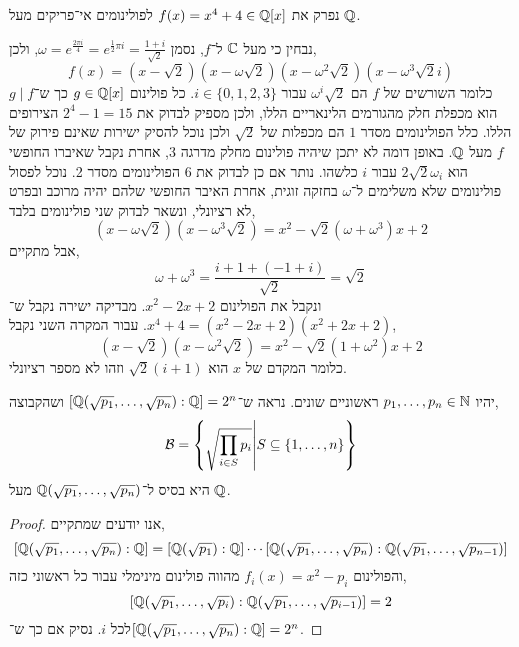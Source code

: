 \question{}
נפרק את $f(x) = x^4 + 4 \in \mathbb{Q}[x]$ לפולינומים אי־פריקים מעל $\mathbb{Q}$.
\begin{solution}
	נבחין כי מעל $\mathbb{C}$ ל־$f$, נסמן $\omega = e^{\frac{2 \pi i}{4}} = e^{\frac{1}{2} \pi i} = \frac{1 + i}{\sqrt{2}}$, ולכן,
	\[
		f(x)
		= (x - \sqrt{2})(x - \omega \sqrt{2})(x - \omega^2 \sqrt{2})(x - \omega^3 \sqrt{2} i)
	\]
	כלומר השורשים של $f$ הם $\omega^i \sqrt{2}$ עבור $i \in \{0, 1, 2, 3\}$.
	כל פולינום $g \in \mathbb{Q}[x]$ כך ש־$g \mid f$ הוא מכפלת חלק מהגורמים הלינאריים הללו, ולכן מספיק לבדוק את $2^4 - 1 = 15$ הצירופים הללו.
	כלל הפולינומים מסדר $1$ הם מכפלות של $\sqrt{2}$ ולכן נוכל להסיק ישירות שאינם פירוק של $f$ מעל $\mathbb{Q}$.
	באופן דומה לא יתכן שיהיה פולינום מחלק מדרגה 3, אחרת נקבל שאיברו החופשי הוא $2 \sqrt{2} \omega_i$ עבור $i$ כלשהו.
	נותר אם כן לבדוק את 6 הפולינומים מסדר 2.
	נוכל לפסול פולינומים שלא משלימים ל־$\omega$ בחזקה זוגית, אחרת האיבר החופשי שלהם יהיה מרוכב ובפרט לא רציונלי, ונשאר לבדוק שני פולינומים בלבד,
	\[
		(x - \omega \sqrt{2}) (x - \omega^3 \sqrt{2})
		= x^2 - \sqrt{2}(\omega + \omega^3) x + 2
	\]
	אבל מתקיים,
	\[
		\omega + \omega^3
		= \frac{i + 1 + (-1 + i)}{\sqrt{2}}
		= \sqrt{2}
	\]
	ונקבל את הפולינום $x^2 - 2x + 2$.
	מבדיקה ישירה נקבל ש־$x^4 + 4 = (x^2 - 2x + 2)(x^2 + 2x + 2)$.
	עבור המקרה השני נקבל,
	\[
		(x - \sqrt{2})(x - \omega^2 \sqrt{2})
		= x^2 - \sqrt{2} (1 + \omega^2) x + 2
	\]
	כלומר המקדם של $x$ הוא $\sqrt{2}(i + 1)$ וזהו לא מספר רציונלי.
\end{solution}

\question{}
יהיו $p_1, \ldots, p_n \in \mathbb{N}$ ראשוניים שונים.
נראה ש־$[\mathbb{Q}(\sqrt{p_1}, \ldots, \sqrt{p_n}) : \mathbb{Q}] = 2^n$ ושהקבוצה,
\[
	\mathcal{B}
	= \left\{ \sqrt{\prod_{i \in S} p_i} \middle| S \subseteq \{1, \ldots, n\} \right\}
\]
היא בסיס ל־$\mathbb{Q}(\sqrt{p_1}, \ldots, \sqrt{p_n})$ מעל $\mathbb{Q}$.
\begin{proof}
	אנו יודעים שמתקיים,
	\[
		[\mathbb{Q}(\sqrt{p_1}, \ldots, \sqrt{p_n}) : \mathbb{Q}]
		= [\mathbb{Q}(\sqrt{p_1}) : \mathbb{Q} ] \cdots [\mathbb{Q}(\sqrt{p_1}, \ldots, \sqrt{p_n}) : \mathbb{Q}(\sqrt{p_1}, \ldots, \sqrt{p_{n - 1}}) ]
	\]
	והפולינום $f_i(x) = x^2 - p_i$ מהווה פולינום מינימלי עבור כל ראשוני כזה,
	\[
		[\mathbb{Q}(\sqrt{p_1}, \ldots, \sqrt{p_i}) : \mathbb{Q}(\sqrt{p_1}, \ldots, \sqrt{p_{i - 1}}) ] = 2
	\]
	לכל $i$.
	נסיק אם כך ש־$[\mathbb{Q}(\sqrt{p_1}, \ldots, \sqrt{p_n}) : \mathbb{Q}] = 2^n$.
\end{proof}


